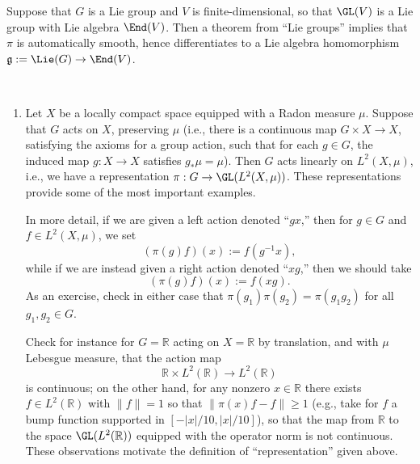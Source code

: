 \documentclass[reqno]{amsart} 
\begin{document}
\begin{remark}
  Suppose that $G$ is a Lie group and $V$ is finite-dimensional, so that $\GL(V)$ is a Lie group with Lie algebra $\End(V)$.  Then a theorem from ``Lie groups'' implies that $\pi$ is automatically smooth, hence differentiates to a Lie algebra homomorphism $\mathfrak{g} := \Lie(G) \rightarrow \End(V)$.
\end{remark}


\begin{example}
~
  \begin{enumerate}
  \item Let $X$ be a locally compact space equipped with a Radon measure $\mu$.  Suppose that $G$ acts on $X$, preserving $\mu$ (i.e., there is a continuous map $G \times X \rightarrow X$, satisfying the axioms for a group action, such that for each $g \in G$, the induced map $g : X \rightarrow X$ satisfies $g_* \mu = \mu$).  Then $G$ acts linearly on $L^2(X,\mu)$, i.e., we have a representation $\pi : G \rightarrow \GL(L^2(X,\mu))$.  These representations provide some of the most important examples.

    In more detail, if we are given a left action denoted ``$g x$,'' then for $g \in G$ and $f \in L^2(X,\mu)$, we set
    \begin{equation}\label{eq:action-on-functions-induced-by-left-translation}
      (\pi(g) f)(x) := f(g^{-1} x),
    \end{equation}
    while if we are instead given a right action denoted ``$x g$,'' then we should take
    \begin{equation}\label{eq:action-on-functions-induced-by-right-translation}
      (\pi(g) f)(x) := f(x g).
    \end{equation}
    As an exercise, check in either case that $\pi(g_1) \pi(g_2) = \pi(g_1 g_2)$ for all $g_1, g_2 \in G$.

    Check for instance for $G = \mathbb{R}$ acting on $X = \mathbb{R}$ by translation, and with $\mu$ Lebesgue measure, that the action map
    \begin{equation}\label{eq:}
      \mathbb{R} \times L^2(\mathbb{R}) \rightarrow L^2(\mathbb{R})
    \end{equation}
    is continuous; on the other hand, for any nonzero $x \in \mathbb{R}$ there exists $f \in L^2(\mathbb{R})$ with $\|f\| = 1$ so that $\|\pi(x) f - f \| \geq 1$ (e.g., take for $f$ a bump function supported in $[-|x|/10, |x|/10]$), so that the map from $\mathbb{R}$ to the space $\GL(L^2(\mathbb{R}))$ equipped with the operator norm is not continuous.  These observations motivate the definition of ``representation'' given above.
    

\end{enumerate}
\end{example}
\end{document}
